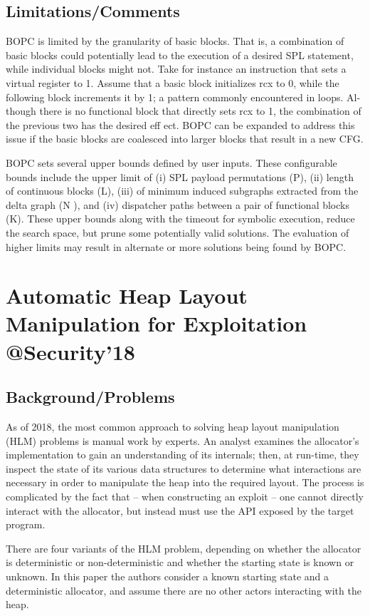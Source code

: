 \subsection{Limitations/Comments}
BOPC is limited by the granularity of basic blocks. That is, a combination of basic blocks could potentially lead to the execution of a desired SPL statement, while individual blocks might not. Take for instance an instruction that sets a virtual register to 1. Assume that a basic block initializes rcx to 0, while the following block increments it by 1; a pattern commonly encountered in loops. Al- though there is no functional block that directly sets rcx to 1, the combination of the previous two has the desired eff ect. BOPC can be expanded to address this issue if the basic blocks are coalesced into larger blocks that result in a new CFG.

BOPC sets several upper bounds defined by user inputs. These configurable bounds include the upper limit of (i) SPL payload permutations (P), (ii) length of continuous blocks (L), (iii) of minimum induced subgraphs extracted from the delta graph (N ), and (iv) dispatcher paths between a pair of functional blocks (K). These upper bounds along with the timeout for symbolic execution, reduce the search space, but prune some potentially valid solutions. The evaluation of higher limits may result in alternate or more solutions being found by BOPC.
\newpage
\section{Automatic Heap Layout Manipulation for Exploitation @Security'18}
\subsection{Background/Problems}
As of 2018, the most common approach to solving heap layout manipulation (HLM) problems is manual work by experts.  An analyst examines the allocator’s implementation to gain an understanding of its internals; then, at run-time, they inspect the state of its various data structures to determine what interactions are necessary in order to manipulate the heap into the required layout. The process is complicated by the fact that – when constructing an exploit – one cannot directly interact with the allocator, but instead must use the API exposed by the target program. 

There are four variants of the HLM problem, depending on whether the allocator is deterministic or non-deterministic and whether the starting state is known or unknown. In this paper the authors consider a known starting state and a deterministic allocator, and assume there are no other actors interacting with the heap. 

